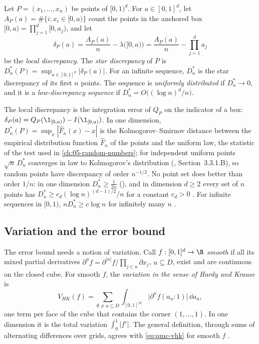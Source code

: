 \begin{definition}[Discrepancy]\label{def:qmc-discrepancy}
Let $P=(x_1,\dots,x_n)$ be points of $[0,1)^d$. For $a\in[0,1]^d$, let
$A_P(a)=\#\{i:x_i\in[0,a)\}$ count the points in the anchored box
$[0,a)=\prod_{j=1}^d[0,a_j)$, and let
\[
  \delta_P(a)=\frac{A_P(a)}{n}-\lambda\big([0,a)\big)=\frac{A_P(a)}{n}-\prod_{j=1}^da_j
\]
be the \emph{local discrepancy}. The \emph{star discrepancy} of $P$ is
$D^*_n(P)=\sup_{a\in[0,1]^d}|\delta_P(a)|$. For an infinite sequence, $D^*_n$ is the star
discrepancy of its first $n$ points. The sequence is \emph{uniformly distributed} if
$D^*_n\to0$, and it is a \emph{low-discrepancy sequence} if $D^*_n=O\big((\log n)^d/n\big)$.
\end{definition}

The local discrepancy is the integration error of $Q_P$ on the indicator of a box:
$\delta_P(a)=Q_P(\1_{[0,a)})-I(\1_{[0,a)})$. In one dimension,
$D^*_n(P)=\sup_x|\hat F_n(x)-x|$ is the Kolmogorov--Smirnov distance between the empirical
distribution function $\hat F_n$ of the points and the uniform law, the statistic of the test
used in \cref{ch:05-random-numbers}; for independent uniform points $\sqrt n\,D^*_n$ converges
in law to Kolmogorov's distribution (\citealp{knuth-taocp2}, Section~3.3.1.B), so random points
have discrepancy of order $n^{-1/2}$.
No point set does better than order $1/n$: in one dimension $D^*_n\ge\frac1{2n}$
(), and in dimension $d\ge2$ every set of $n$ points has
$D^*_n\ge c_d(\log n)^{(d-1)/2}/n$ for a constant $c_d>0$ \citep{roth-1954}. For infinite
sequences in $[0,1)$, $nD^*_n\ge c\log n$ for infinitely many $n$ \citep{schmidt-1972}.

\subsection*{Variation and the error bound}

The error bound needs a notion of variation. Call $f:[0,1]^d\to\R$ \emph{smooth} if all its
mixed partial derivatives $\partial^uf=\partial^{|u|}f/\prod_{j\in u}\partial x_j$,
$u\subseteq D$, exist and are continuous on the closed cube. For smooth $f$, the
\emph{variation in the sense of Hardy and Krause} is
\begin{equation}\label{eq:qmc-vhk}
  V_{HK}(f)=\sum_{\emptyset\ne u\subseteq D}\int_{[0,1]^{|u|}}\big|\partial^uf(a_u{:}1)\big|\,\dd a_u ,
\end{equation}
one term per face of the cube that contains the corner $(1,\dots,1)$. In one dimension it is
the total variation $\int_0^1|f'|$. The general definition, through sums of alternating
differences over grids, agrees with \eqref{eq:qmc-vhk} for smooth $f$ \citep{owen-2005}.

